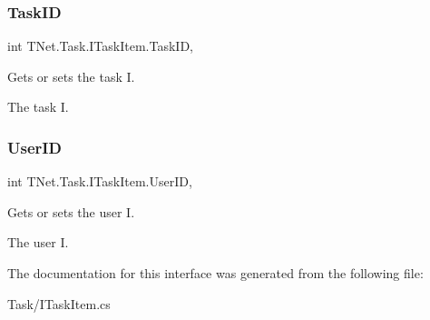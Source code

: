 \subsubsection{\texorpdfstring{Task\+ID}{TaskID}}
{\footnotesize\ttfamily int T\+Net.\+Task.\+I\+Task\+Item.\+Task\+ID\hspace{0.3cm}{\ttfamily [get]}, {\ttfamily [set]}}



Gets or sets the task I. 

The task I.\mbox{\label{interface_t_net_1_1_task_1_1_i_task_item_a93aff6c4a183a16b2e48eed8a883169d}} 
\subsubsection{\texorpdfstring{User\+ID}{UserID}}
{\footnotesize\ttfamily int T\+Net.\+Task.\+I\+Task\+Item.\+User\+ID\hspace{0.3cm}{\ttfamily [get]}, {\ttfamily [set]}}



Gets or sets the user I. 

The user I.

The documentation for this interface was generated from the following file\+:\begin{DoxyCompactItemize}
\item 
Task/I\+Task\+Item.\+cs\end{DoxyCompactItemize}
